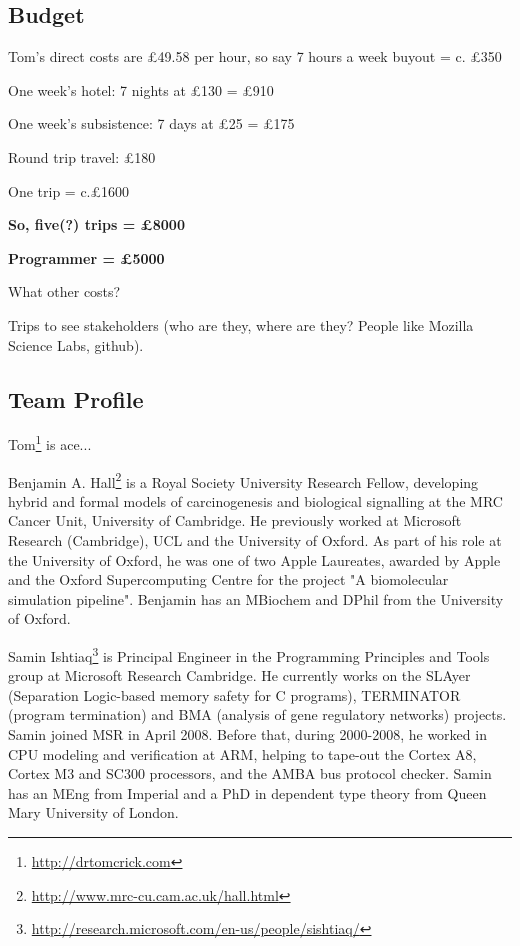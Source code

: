 \documentclass[a4paper,11pt]{article}
\begin{document}



\subsection*{Budget}

Tom's direct costs are \pounds 49.58 per hour, so say 7 hours a week
buyout = c. \pounds 350

One week's hotel: 7 nights at \pounds 130 = \pounds 910

One week's subsistence: 7 days at \pounds 25 = \pounds 175

Round trip travel: \pounds 180

One trip = c.£1600

{\textbf{So, five(?) trips = \pounds 8000}}

{\textbf{Programmer = \pounds 5000}}

What other costs?

Trips to see stakeholders (who are they, where are they? People like Mozilla Science Labs, github). 

\subsection*{Team Profile}

Tom\footnote{\url{http://drtomcrick.com}} is ace...

Benjamin A. Hall\footnote{\url{http://www.mrc-cu.cam.ac.uk/hall.html}} is a Royal Society University Research Fellow, developing hybrid and formal models of carcinogenesis and biological signalling at the MRC Cancer Unit, University of Cambridge. He previously worked at Microsoft Research (Cambridge), UCL and the University of Oxford. As part of his role at the University of Oxford, he was one of two Apple Laureates, awarded by Apple and the Oxford Supercomputing Centre for the project "A biomolecular simulation pipeline". Benjamin has an MBiochem and DPhil from the University of Oxford.

Samin Ishtiaq\footnote{\url{http://research.microsoft.com/en-us/people/sishtiaq/}} is Principal Engineer in the Programming Principles and Tools group at Microsoft Research Cambridge. He currently works on the SLAyer (Separation Logic-based memory safety for C programs), TERMINATOR (program termination) and BMA (analysis of gene regulatory networks) projects. Samin joined MSR in April 2008. Before that, during 2000-2008, he worked in CPU modeling and verification at ARM, helping to tape-out the Cortex A8, Cortex M3 and SC300 processors, and the AMBA bus protocol checker. Samin has an MEng from Imperial and a PhD in dependent type theory from Queen Mary University of London.



\end{document}
